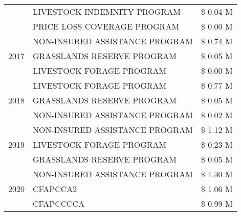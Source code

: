 \begin{tabular}{llr}
 & LIVESTOCK INDEMNITY PROGRAM & \$ 0.04 M \\
 & PRICE LOSS COVERAGE PROGRAM & \$ 0.00 M \\
\cline{1-3}
\multirow[t]{3}{*}{2017} & NON-INSURED ASSISTANCE PROGRAM & \$ 0.74 M \\
 & GRASSLANDS RESERVE PROGRAM & \$ 0.05 M \\
 & LIVESTOCK FORAGE PROGRAM & \$ 0.00 M \\
\cline{1-3}
\multirow[t]{3}{*}{2018} & LIVESTOCK FORAGE PROGRAM & \$ 0.77 M \\
 & GRASSLANDS RESERVE PROGRAM & \$ 0.05 M \\
 & NON-INSURED ASSISTANCE PROGRAM & \$ 0.02 M \\
\cline{1-3}
\multirow[t]{3}{*}{2019} & NON-INSURED ASSISTANCE PROGRAM & \$ 1.12 M \\
 & LIVESTOCK FORAGE PROGRAM & \$ 0.23 M \\
 & GRASSLANDS RESERVE PROGRAM & \$ 0.05 M \\
\cline{1-3}
\multirow[t]{3}{*}{2020} & NON-INSURED ASSISTANCE PROGRAM & \$ 1.30 M \\
 & CFAPCCA2 & \$ 1.06 M \\
 & CFAPCCCCA & \$ 0.99 M \\
\cline{1-3}
\bottomrule
\end{tabular}
